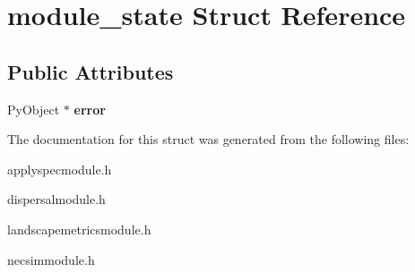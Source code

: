 \hypertarget{structmodule__state}{}\section{module\+\_\+state Struct Reference}
\label{structmodule__state}
\subsection*{Public Attributes}
\begin{DoxyCompactItemize}
\item 
Py\+Object $\ast$ {\bfseries error}\hypertarget{structmodule__state_a6593da300121fe46fad3e7280053fab8}{}\label{structmodule__state_a6593da300121fe46fad3e7280053fab8}

\end{DoxyCompactItemize}


The documentation for this struct was generated from the following files\+:\begin{DoxyCompactItemize}
\item 
applyspecmodule.\+h\item 
dispersalmodule.\+h\item 
landscapemetricsmodule.\+h\item 
necsimmodule.\+h\end{DoxyCompactItemize}
